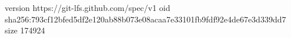 version https://git-lfs.github.com/spec/v1
oid sha256:793cf12bfed5df2e120ab88b073e08acaa7e33101fb9fdf92e4de67e3d339dd7
size 174924
